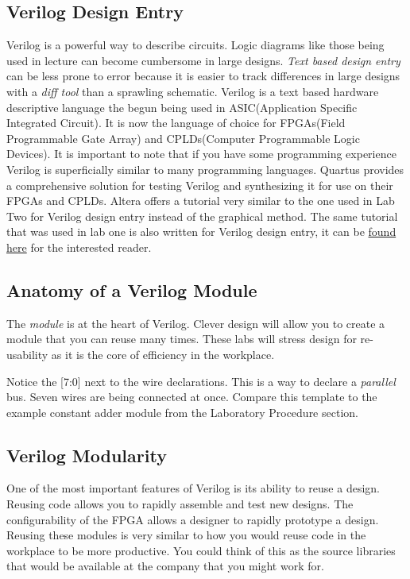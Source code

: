     \subsection{Verilog Design Entry}
      Verilog is a powerful way to describe circuits. Logic diagrams like those being used in lecture can become cumbersome in large designs. {\it Text based design entry} can be less prone to error because it is easier to track differences in large designs with a {\it diff tool} than a sprawling schematic. Verilog is a text based hardware descriptive language the begun being used in ASIC(Application Specific Integrated Circuit). It is now the language of choice for FPGAs(Field Programmable Gate Array) and CPLDs(Computer Programmable Logic Devices). It is important to note that if you have some programming experience Verilog is superficially similar to many programming languages. Quartus provides a comprehensive solution for testing Verilog and synthesizing it for use on their FPGAs and CPLDs. Altera offers a tutorial very similar to the one used in Lab Two for Verilog design entry instead of the graphical method. The same tutorial that was used in lab one is also written for Verilog design entry, it can be \href{ftp://ftp.altera.com/up/pub/Altera_Material/13.0/Tutorials/Verilog/Quartus_II_Introduction.pdf}{found here} for the interested reader.

    \subsection{Anatomy of a Verilog Module}
      The {\it module} is at the heart of Verilog. Clever design will allow you to create a module that you can reuse many times. These labs will stress design for re-usability as it is the core of efficiency in the workplace.
       

      Notice the [7:0] next to the wire declarations. This is a way to declare a {\it parallel} bus. Seven wires are being connected at once. Compare this template to the example constant adder module from the Laboratory Procedure section.
      
      

    \subsection{Verilog Modularity}
      One of the most important features of Verilog is its ability to reuse a design. Reusing code allows you to  rapidly assemble and test new designs. The configurability of the FPGA allows a designer to rapidly prototype a design. Reusing these modules is very similar to how you would reuse code in the workplace to be more productive. You could think of this as the source libraries that would be available at the company that you might work for.

